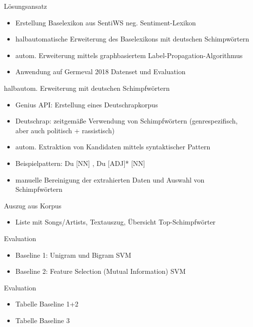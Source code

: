 \documentclass{beamer}
\begin{document}
\begin{frame}{Lösungsansatz}
\begin{itemize}
\item Erstellung Baselexikon aus SentiWS neg. Sentiment-Lexikon
\item halbautomatische Erweiterung des Baselexikons mit deutschen Schimpwörtern
\item autom. Erweiterung mittels graphbasiertem Label-Propagation-Algorithmus
\item Anwendung auf Germeval 2018 Datenset und Evaluation
\end{itemize}
\end{frame}

\begin{frame}{halbautom. Erweiterung mit deutschen Schimpfwörtern}
\begin{itemize}
\item Genius API: Erstellung eines Deutschrapkorpus 
\item Deutschrap: zeitgemäße Verwendung von Schimpfwörtern (genrespezifisch, aber auch politisch + rassistisch)
\item autom. Extraktion von Kandidaten mittels syntaktischer Pattern
\item Beispielpattern: Du [NN] , Du [ADJ]* [NN]
\item manuelle Bereinigung der extrahierten Daten und Auswahl von Schimpfwörtern
\end{itemize}
\end{frame}

\begin{frame}{Auszug aus Korpus}
\begin{itemize}
\item Liste mit Songs/Artists, Textauszug, Übersicht Top-Schimpfwörter
\end{itemize}
\end{frame}


\begin{frame}{Evaluation}
\begin{itemize}
\item Baseline 1: Unigram und Bigram SVM 
\item Baseline 2: Feature Selection (Mutual Information) SVM 
\end{itemize}
\end{frame}

\begin{frame}{Evaluation}
\begin{itemize}
\item Tabelle Baseline 1+2
\item Tabelle Baseline 3
\end{itemize}
\end{frame}
\end{document}
